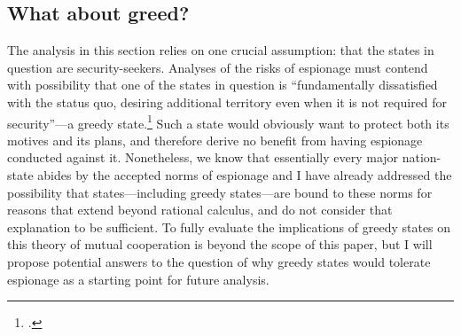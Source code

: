 \documentclass[14pt]{extarticle}
\begin{document}

\subsection{What about greed?}
The analysis in this section relies on one crucial assumption: that the states in question are security-seekers. Analyses of the risks of espionage must contend with possibility that one of the states in question is \enquote{fundamentally dissatisfied with the status quo, desiring additional territory even when it is not required for security}---a greedy state.\footcite[p.~4]{glaser_rational_2010} Such a state would obviously want to protect both its motives and its plans, and therefore derive no benefit from having espionage conducted against it. Nonetheless, we know that essentially every major nation-state abides by the accepted norms of espionage and I have already addressed the possibility that states---including greedy states---are bound to these norms for reasons that extend beyond rational calculus, and do not consider that explanation to be sufficient. To fully evaluate the implications of greedy states on this theory of mutual cooperation is beyond the scope of this paper, but I will propose potential answers to the question of why greedy states would tolerate espionage as a starting point for future analysis.
\end{document}
